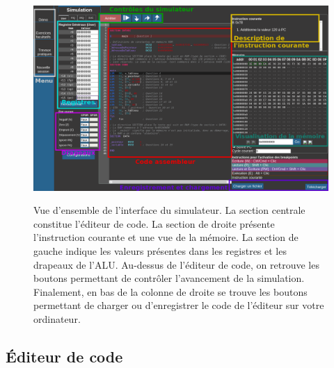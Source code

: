 \documentclass{tufte-handout}
\begin{document}
\begin{figure}
\includegraphics[width=\linewidth]{pics/main_labeled.png}
\label{f:global}
\caption{Vue d'ensemble de l'interface du simulateur. La section centrale constitue l'éditeur de code. La section de droite présente l'instruction courante et une vue de la mémoire. La section de gauche indique les valeurs présentes dans les registres et les drapeaux de l'ALU. Au-dessus de l'éditeur de code, on retrouve les boutons permettant de contrôler l'avancement de la simulation. Finalement, en bas de la colonne de droite se trouve les boutons permettant de charger ou d'enregistrer le code de l'éditeur sur votre ordinateur.}
\end{figure}

\subsection{Éditeur de code}
\end{document}
